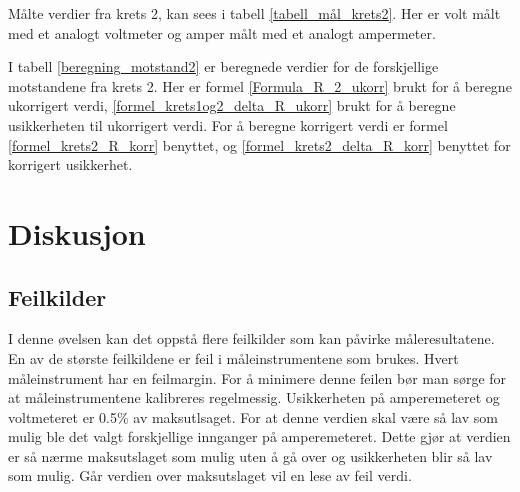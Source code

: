 \documentclass[twocolumn, a4paper, 11pt]{article} %
\begin{document}
Målte verdier fra krets 2, kan sees i tabell \ref{tabell_mål_krets2}. Her er volt målt med et analogt voltmeter og amper målt med et analogt ampermeter.

\begin{table}[H]
\centering
\caption{Krets 2.}
\label{tabell_mål_krets2}
\end{table}


I tabell \ref{beregning_motstand2} er beregnede verdier for de forskjellige motstandene fra krets 2. Her er formel \eqref{Formula_R_2_ukorr} brukt for å beregne ukorrigert verdi, \eqref{formel_krets1og2_delta_R_ukorr} brukt for å beregne usikkerheten til  ukorrigert verdi. For å beregne korrigert verdi er formel \eqref{formel_krets2_R_korr} benyttet, og \eqref{formel_krets2_delta_R_korr} benyttet for korrigert usikkerhet.


\begin{table}[H]
\centering
\caption{Krets 2 motstand beregning.}
\label{beregning_motstand2}
\end{table}



\section{Diskusjon}

\subsection{Feilkilder}
I denne øvelsen kan det oppstå flere feilkilder som kan påvirke måleresultatene. 
En av de største feilkildene er feil i måleinstrumentene som brukes. Hvert måleinstrument har en feilmargin. For å minimere denne feilen bør man sørge for at måleinstrumentene kalibreres regelmessig. Usikkerheten på amperemeteret og voltmeteret er 0.5\% av maksutlsaget. For at denne verdien skal være så lav som mulig ble det valgt forskjellige innganger på amperemeteret. Dette gjør at verdien er så nærme maksutslaget som mulig uten å gå over og usikkerheten blir så lav som mulig. Går verdien over maksutslaget vil en lese av feil verdi.
\end{document}
